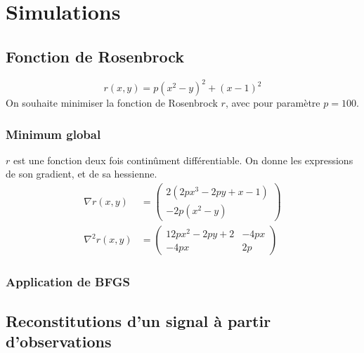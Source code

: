 \documentclass[3p, twocolumn]{elsarticle}
\begin{document}
\section{Simulations}
\subsection{Fonction de Rosenbrock}
\begin{equation}
    r(x,y)=p(x^2-y)^2+(x-1)^2
    \label{eq:rosenbrock-function}
\end{equation}
On souhaite minimiser la fonction de Rosenbrock $r$, avec pour paramètre $p=100$.

\subsubsection{Minimum global}
    $r$ est une fonction deux fois continûment différentiable. On donne les expressions de son gradient, et de sa hessienne.
    \begin{align*}
        \nabla r(x,y) &=
        \begin{pmatrix}
            2(2px^3-2py+x-1)\\
            -2p(x^2-y)
        \end{pmatrix}\\
        \nabla ^2 r(x,y) &=
        \begin{pmatrix}
            12px^2-2py+2 & -4px\\
            -4px & 2p
        \end{pmatrix}
    \end{align*}
\subsubsection{Application de BFGS}

\subsection{Reconstitutions d'un signal à partir d'observations}
\end{document}
